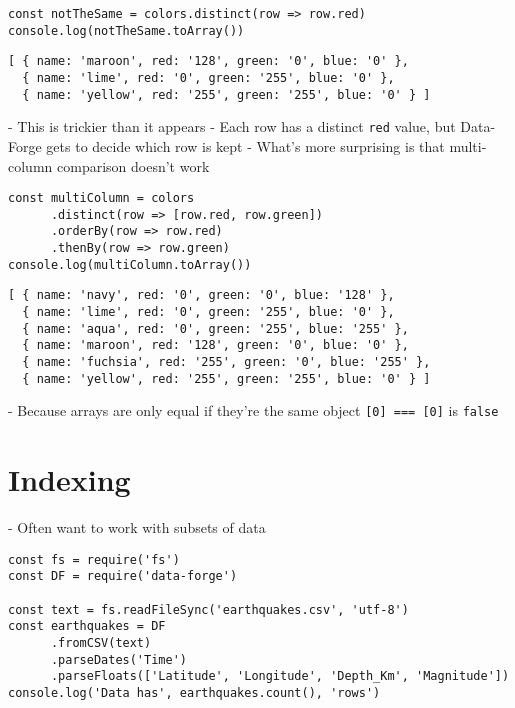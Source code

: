 \begin{verbatim}
const notTheSame = colors.distinct(row => row.red)
console.log(notTheSame.toArray())
\end{verbatim}

\begin{verbatim}
[ { name: 'maroon', red: '128', green: '0', blue: '0' },
  { name: 'lime', red: '0', green: '255', blue: '0' },
  { name: 'yellow', red: '255', green: '255', blue: '0' } ]
\end{verbatim}

-   This is trickier than it appears
    -   Each row has a distinct \texttt{red} value,
        but Data-Forge gets to decide which row is kept
-   What's more surprising is that multi-column comparison doesn't work

\begin{verbatim}
const multiColumn = colors
      .distinct(row => [row.red, row.green])
      .orderBy(row => row.red)
      .thenBy(row => row.green)
console.log(multiColumn.toArray())
\end{verbatim}

\begin{verbatim}
[ { name: 'navy', red: '0', green: '0', blue: '128' },
  { name: 'lime', red: '0', green: '255', blue: '0' },
  { name: 'aqua', red: '0', green: '255', blue: '255' },
  { name: 'maroon', red: '128', green: '0', blue: '0' },
  { name: 'fuchsia', red: '255', green: '0', blue: '255' },
  { name: 'yellow', red: '255', green: '255', blue: '0' } ]
\end{verbatim}

-   Because arrays are only equal if they're the same object
    \texttt{[0] === [0]} is \texttt{false}

\section{Indexing}\label{s:dataforge-indexing}

-   Often want to work with subsets of data

\begin{verbatim}
const fs = require('fs')
const DF = require('data-forge')

const text = fs.readFileSync('earthquakes.csv', 'utf-8')
const earthquakes = DF
      .fromCSV(text)
      .parseDates('Time')
      .parseFloats(['Latitude', 'Longitude', 'Depth_Km', 'Magnitude'])
console.log('Data has', earthquakes.count(), 'rows')
\end{verbatim}

